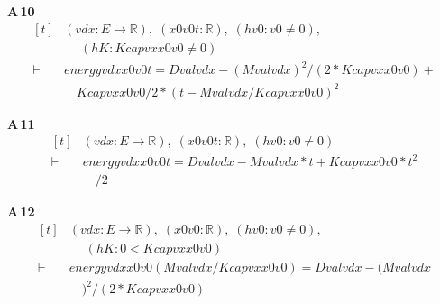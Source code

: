 \noindent\textbf{A\,10}\quad{}
{\footnotesize\[ \begin{aligned}[t]
&(\mathit{v} \mathit{d} \mathit{x} : \mathit{E} \to \mathbb{R} ),\; (\mathit{x0} \mathit{v0} \mathit{t} : \mathbb{R} ),\; (\mathit{hv0} : \mathit{v0} \neq 0),\\
&\quad \; (\mathit{hK} : \mathit{Kcap} \mathit{v} \mathit{x} \mathit{x0} \mathit{v0} \neq 0)\\
\vdash\;&\mathit{energy} \mathit{v} \mathit{d} \mathit{x} \mathit{x0} \mathit{v0} \mathit{t} = \mathit{Dval} \mathit{v} \mathit{d} \mathit{x} - (\mathit{Mval} \mathit{v} \mathit{d} \mathit{x}) ^{2} / (2 * \mathit{Kcap} \mathit{v} \mathit{x} \mathit{x0} \mathit{v0}) +\\
&\quad \mathit{Kcap} \mathit{v} \mathit{x} \mathit{x0} \mathit{v0} / 2 * (\mathit{t} - \mathit{Mval} \mathit{v} \mathit{d} \mathit{x} / \mathit{Kcap} \mathit{v} \mathit{x} \mathit{x0} \mathit{v0}) ^{2}
\end{aligned} \]}

\noindent\textbf{A\,11}\quad{}
{\footnotesize\[ \begin{aligned}[t]
&(\mathit{v} \mathit{d} \mathit{x} : \mathit{E} \to \mathbb{R} ),\; (\mathit{x0} \mathit{v0} \mathit{t} : \mathbb{R} ),\; (\mathit{hv0} : \mathit{v0} \neq 0)\\
\vdash\;&\mathit{energy} \mathit{v} \mathit{d} \mathit{x} \mathit{x0} \mathit{v0} \mathit{t} = \mathit{Dval} \mathit{v} \mathit{d} \mathit{x} - \mathit{Mval} \mathit{v} \mathit{d} \mathit{x} * \mathit{t} + \mathit{Kcap} \mathit{v} \mathit{x} \mathit{x0} \mathit{v0} * \mathit{t} ^{2}\\
&\quad / 2
\end{aligned} \]}

\noindent\textbf{A\,12}\quad{}
{\footnotesize\[ \begin{aligned}[t]
&(\mathit{v} \mathit{d} \mathit{x} : \mathit{E} \to \mathbb{R} ),\; (\mathit{x0} \mathit{v0} : \mathbb{R} ),\; (\mathit{hv0} : \mathit{v0} \neq 0),\\
&\quad \; (\mathit{hK} : 0 < \mathit{Kcap} \mathit{v} \mathit{x} \mathit{x0} \mathit{v0})\\
\vdash\;&\mathit{energy} \mathit{v} \mathit{d} \mathit{x} \mathit{x0} \mathit{v0} (\mathit{Mval} \mathit{v} \mathit{d} \mathit{x} / \mathit{Kcap} \mathit{v} \mathit{x} \mathit{x0} \mathit{v0}) = \mathit{Dval} \mathit{v} \mathit{d} \mathit{x} - (\mathit{Mval} \mathit{v} \mathit{d} \mathit{x}\\
&\quad ) ^{2} / (2 * \mathit{Kcap} \mathit{v} \mathit{x} \mathit{x0} \mathit{v0})
\end{aligned} \]}

